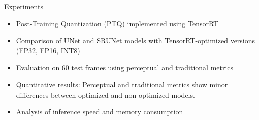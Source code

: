 \documentclass{beamer}
\begin{document}

\begin{frame}{Experiments}
\begin{itemize}
  \item Post-Training Quantization (PTQ) implemented using TensorRT
  \item Comparison of UNet and SRUNet models with TensorRT-optimized versions (FP32, FP16, INT8)
  \item Evaluation on 60 test frames using perceptual and traditional metrics
  \item Quantitative results: Perceptual and traditional metrics show minor differences between optimized and non-optimized models.
  \item Analysis of inference speed and memory consumption
\end{itemize}
\end{frame}
\end{document}
